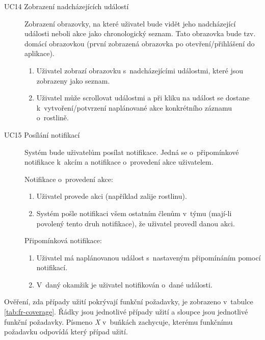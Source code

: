 \documentclass[thesis=M,czech]{FITthesis}[2019/12/23]
\begin{document}
\begin{description}
    \item[UC14 Zobrazení nadcházejících událostí] Zobrazení obrazovky, na které uživatel bude vidět jeho nadcházející události neboli akce jako chronologický seznam. Tato obrazovka bude tzv. domácí obrazovkou (první zobrazená obrazovka po otevření/přihlášení do aplikace).
    \begin{enumerate}
        \item Uživatel zobrazí obrazovku s~nadcházejícími událostmi, které jsou zobrazeny jako seznam.
        \item Uživatel může scrollovat událostmi a při kliku na událost se dostane k~vytvoření/potvrzení naplánované akce konkrétního záznamu o~rostlině.
    \end{enumerate}
    
    \item[UC15 Posílání notifikací] Systém bude uživatelům posílat notifikace. Jedná se o~připomínkové notifikace k~akcím a notifikace o~provedení akce uživatelem.
    
    Notifikace o~provedení akce:
    \begin{enumerate}
        \item Uživatel provede akci (například zalije rostlinu).
        \item Systém pošle notifikaci všem ostatním členům v~týmu (mají-li povolený tento druh notifikace), že uživatel provedl danou akci.
    \end{enumerate}
    
    Připomínková notifikace:
    \begin{enumerate}
        \item Uživatel má naplánovanou událost s~nastaveným připomínáním pomocí notifikací.
        \item V~daný okamžik je uživatel notifikován o~dané události.
    \end{enumerate}
    
\end{description}

Ověření, zda případy užití pokrývají funkční požadavky, je zobrazeno v~tabulce \ref{tab:fr-coverage}. Řádky jsou jednotlivé případy užití a sloupce jsou jednotlivé funkční požadavky. Písmeno \textit{X} v~buňkách zachycuje, kterému funkčnímu požadavku odpovídá který případ užití.
\end{document}
